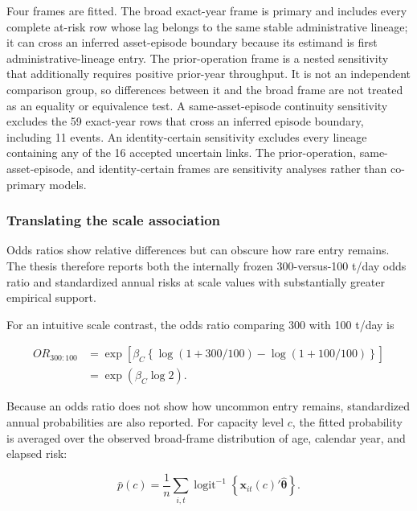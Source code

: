 \documentclass[12pt,a4paper]{article}
\begin{document}
Four frames are fitted. The broad exact-year frame is primary and includes every complete
at-risk row whose lag belongs to the same stable administrative lineage; it can
cross an inferred asset-episode boundary because its estimand is first
administrative-lineage entry. The prior-operation frame is a nested sensitivity
that additionally requires positive prior-year throughput. It is not an
independent comparison group, so differences between it and the broad frame are
not treated as an equality or equivalence test. A same-asset-episode continuity
sensitivity excludes the 59 exact-year rows that cross an inferred episode
boundary, including 11 events. An identity-certain sensitivity excludes every
lineage containing any of the 16 accepted uncertain links. The prior-operation,
same-asset-episode, and identity-certain frames are sensitivity analyses rather
than co-primary models.

\subsubsection{Translating the scale association}

Odds ratios show relative differences but can obscure how rare entry remains.
The thesis therefore reports both the internally frozen 300-versus-100 t/day
odds ratio and standardized annual risks at scale values with substantially
greater empirical support.

For an intuitive scale contrast, the odds ratio comparing 300 with 100 t/day is

\begin{equation}
\begin{split}
OR_{300:100}
&=\exp\!\left[\beta_C
\left\{\log(1+300/100)-\log(1+100/100)\right\}\right]\\
&=\exp(\beta_C\log 2).
\end{split}
\label{eq:capacity-contrast}
\end{equation}

Because an odds ratio does not show how uncommon entry remains, standardized
annual probabilities are also reported. For capacity level $c$, the fitted
probability is averaged over the observed broad-frame distribution of age,
calendar year, and elapsed risk:

\begin{equation}
\bar p(c)=\frac{1}{n}\sum_{i,t}
\operatorname{logit}^{-1}\!\left\{\mathbf{x}_{it}(c)'
\hat{\boldsymbol\theta}\right\}.
\label{eq:standardized-entry-risk}
\end{equation}
\end{document}

